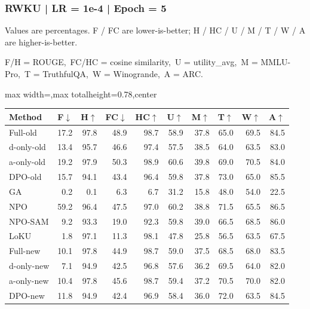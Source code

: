 \documentclass[aspectratio=169,11pt]{beamer}
\begin{document}
\begin{frame}[t]
\frametitle{RWKU | LR = 1e-4 | Epoch = 5}
{\tiny Values are percentages. F / FC are lower-is-better; H / HC / U / M / T / W / A are higher-is-better.}

{\tiny F/H = ROUGE,\ FC/HC = cosine similarity,\ U = utility\_avg,\ M = MMLU-Pro,\ T = TruthfulQA,\ W = Winogrande,\ A = ARC.}

\vspace{0.35em}
\centering
\scriptsize
\setlength{\tabcolsep}{3.6pt}
\renewcommand{\arraystretch}{1.05}
\begin{adjustbox}{max width=\textwidth,max totalheight=0.78\textheight,center}
\begin{tabular}{l*{9}{r}}
\toprule
Method & F$\downarrow$ & H$\uparrow$ & FC$\downarrow$ & HC$\uparrow$ & U$\uparrow$ & M$\uparrow$ & T$\uparrow$ & W$\uparrow$ & A$\uparrow$ \\
\midrule
\rowcolor{blue!10}
Full-old & 17.2 & 97.8 & 48.9 & 98.7 & 58.9 & 37.8 & 65.0 & 69.5 & 84.5 \\
\rowcolor{orange!10}
d-only-old & 13.4 & 95.7 & 46.6 & 97.4 & 57.5 & 38.5 & 64.0 & 63.5 & 83.0 \\
\rowcolor{green!10}
a-only-old & 19.2 & 97.9 & 50.3 & 98.9 & 60.6 & 39.8 & 69.0 & 70.5 & 84.0 \\
\rowcolor{gray!8}
DPO-old & 15.7 & 94.1 & 43.4 & 96.4 & 59.8 & 37.8 & 73.0 & 65.0 & 85.5 \\
\rowcolor{gray!8}
GA & 0.2 & 0.1 & 6.3 & 6.7 & 31.2 & 15.8 & 48.0 & 54.0 & 22.5 \\
\rowcolor{gray!8}
NPO & 59.2 & 96.4 & 47.5 & 97.0 & 60.2 & 38.8 & 71.5 & 65.5 & 86.5 \\
\rowcolor{gray!8}
NPO-SAM & 9.2 & 93.3 & 19.0 & 92.3 & 59.8 & 39.0 & 66.5 & 68.5 & 86.0 \\
\rowcolor{gray!8}
LoKU & 1.8 & 97.1 & 11.3 & 98.1 & 47.8 & 25.8 & 56.5 & 63.5 & 67.5 \\
\rowcolor{blue!20}
Full-new & 10.1 & 97.8 & 44.9 & 98.7 & 59.0 & 37.5 & 68.5 & 68.0 & 83.5 \\
\rowcolor{orange!20}
d-only-new & 7.1 & 94.9 & 42.5 & 96.8 & 57.6 & 36.2 & 69.5 & 64.0 & 82.0 \\
\rowcolor{green!20}
a-only-new & 10.4 & 97.8 & 45.6 & 98.7 & 59.4 & 37.2 & 70.5 & 70.0 & 82.0 \\
\rowcolor{gray!15}
DPO-new & 11.8 & 94.9 & 42.4 & 96.9 & 58.4 & 36.0 & 72.0 & 63.5 & 84.5 \\
\bottomrule
\end{tabular}
\end{adjustbox}
\end{frame}
\end{document}
